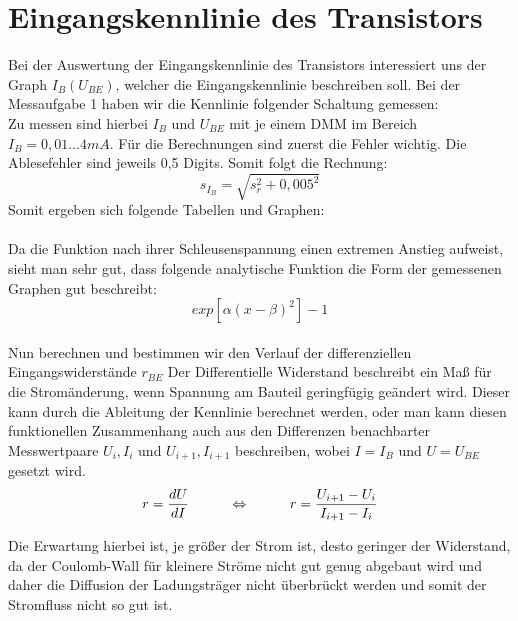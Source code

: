 

\section{Eingangskennlinie des Transistors}
Bei der Auswertung der Eingangskennlinie des Transistors interessiert uns der Graph $I_B(U_{BE})$, welcher die Eingangskennlinie beschreiben soll. Bei der Messaufgabe 1 haben wir die Kennlinie folgender Schaltung gemessen:\\
Zu messen sind hierbei $I_B$ und $U_{BE}$ mit je einem DMM im Bereich $I_B=0,01...4mA$.
F\"ur die Berechnungen sind zuerst die Fehler wichtig. Die Ablesefehler sind jeweils 0,5 Digits. Somit folgt die Rechnung:\\
\begin{equation}
s_{I_B}=\sqrt{s_r^2+0,005^2}
\end{equation}
Somit ergeben sich folgende Tabellen und Graphen:\\\\


Da die Funktion nach ihrer Schleusenspannung einen extremen Anstieg aufweist, sieht man sehr gut, dass folgende analytische Funktion die Form der gemessenen Graphen gut beschreibt: 
\begin{equation}
exp[\alpha(x-\beta)^2]-1
\end{equation}\\
Nun berechnen und bestimmen wir den Verlauf der differenziellen Eingangswiderst\"ande $r_{BE}$
Der Differentielle Widerstand beschreibt ein Maß f\"ur die Strom\"anderung, wenn Spannung am Bauteil geringf\"ugig ge\"andert wird. Dieser kann durch die Ableitung der Kennlinie berechnet werden, oder man kann diesen funktionellen Zusammenhang auch aus den Differenzen benachbarter Messwertpaare $U_i, I_i$ und $U_{i+1},  I_{i+1}$ beschreiben, wobei $I=I_B$ und $U=U_{BE}$ gesetzt wird. 
\begin{align}
r=\frac{dU}{dI}\hspace*{1cm} \Leftrightarrow \hspace*{1cm} r=\frac{U_{i+1}-U_i}{I_{i+1}-I_i}
\end{align}


Die Erwartung hierbei ist, je gr\"o\ss{}er der Strom ist, desto geringer der Widerstand, da der Coulomb-Wall f\"ur kleinere Str\"ome nicht gut genug abgebaut wird und daher die Diffusion der Ladungstr\"ager nicht \"uberbr\"uckt werden und somit der Stromfluss nicht so gut ist.
